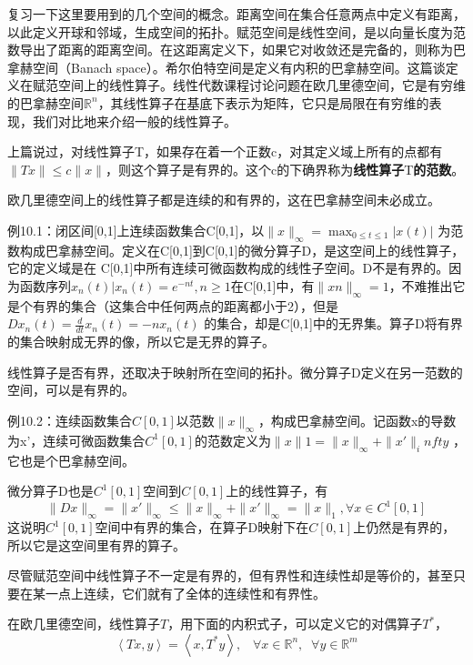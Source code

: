 复习一下这里要用到的几个空间的概念。距离空间在集合任意两点中定义有距离，以此定义开球和邻域，生成空间的拓扑。赋范空间是线性空间，是以向量长度为范数导出了距离的距离空间。在这距离定义下，如果它对收敛还是完备的，则称为巴拿赫空间（Banach space）。希尔伯特空间是定义有内积的巴拿赫空间。这篇谈定义在赋范空间上的线性算子。线性代数课程讨论问题在欧几里德空间，它是有穷维的巴拿赫空间$ \mathbb{R}^n $，其线性算子在基底下表示为矩阵，它只是局限在有穷维的表现，我们对比地来介绍一般的线性算子。

上篇说过，对线性算子T，如果存在着一个正数c，对其定义域上所有的点都有$ \|Tx\| \leq c\|x\| $，则这个算子是有界的。这个c的下确界称为\textbf{线性算子}T\textbf{的范数}。

欧几里德空间上的线性算子都是连续的和有界的，这在巴拿赫空间未必成立。

\kaishu\setlength{\leftskip}{1em}

例10.1：闭区间[0,1]上连续函数集合C[0,1]，以$ \|x\|_\infty = \max_{0\leq t \leq 1} |x(t)| $ 为范数构成巴拿赫空间。定义在C[0,1]到C[0,1]的微分算子D，是这空间上的线性算子，它的定义域是在 C[0,1]中所有连续可微函数构成的线性子空间。D不是有界的。因为函数序列{$ x_n(t)|x_n(t)=e^{−nt}, n\geq 1 $}在C[0,1]中，有$ \|xn\|_\infty =1 $，不难推出它是个有界的集合（这集合中任何两点的距离都小于2），但是$ Dx_n(t)=\frac{d}{dt}x_n(t)=−nx_n(t) $ 的集合，却是C[0,1]中的无界集。算子D将有界的集合映射成无界的像，所以它是无界的算子。

\songti\setlength{\leftskip}{0em}

线性算子是否有界，还取决于映射所在空间的拓扑。微分算子D定义在另一范数的空间，可以是有界的。

\kaishu\setlength{\leftskip}{1em}

例10.2：连续函数集合$ C[0,1] $以范数$ \|x\|_\infty $，构成巴拿赫空间。记函数x的导数为x’，连续可微函数集合$ C^1[0,1] $的范数定义为$\|x\|1= \|x\|_\infty +\|x′\|_infty$ ，它也是个巴拿赫空间。

微分算子D也是$ C^1[0,1] $空间到$ C[0,1] $上的线性算子，有
\[\|Dx\|_\infty =\|x′\|_\infty \leq \|x\|_\infty +\|x′\|_\infty =\|x\|_1,\forall x \in C^1[0,1]\]
这说明$ C^1[0,1]$空间中有界的集合，在算子D映射下在$ C[0,1] $上仍然是有界的，所以它是这空间里有界的算子。

\songti\setlength{\leftskip}{0em}

尽管赋范空间中线性算子不一定是有界的，但有界性和连续性却是等价的，甚至只要在某一点上连续，它们就有了全体的连续性和有界性。

在欧几里德空间，线性算子$ T $，用下面的内积式子，可以定义它的对偶算子$ T^* $，
\begin{equation}
	\left\langle Tx, y \right \rangle = \left \langle x, T^* y \right \rangle, \;\;\;  \forall x \in \mathbb{R}^n, \;\; \forall y \in \mathbb{R}^m
\end{equation}

